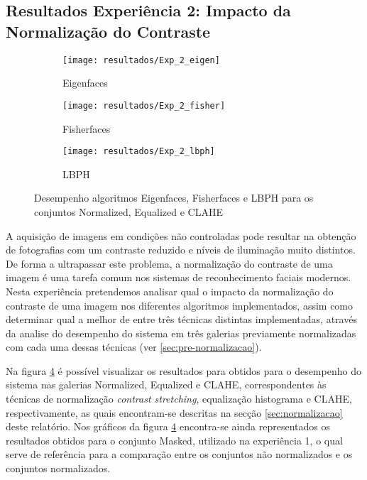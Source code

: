 \subsection{Resultados Experiência 2: Impacto da Normalização do Contraste}
\begin{figure}[p]
        \centering
        \begin{subfigure}[b]{0.58\textwidth}
                \centering
                \texttt{[image: resultados/Exp\_2\_eigen]}
                \caption{Eigenfaces}
                \label{fig:masked_normalized_equalized_clahe_eigen}
        \end{subfigure}%

        \begin{subfigure}[b]{0.58\textwidth}
                \centering
                \texttt{[image: resultados/Exp\_2\_fisher]}
                \caption{Fisherfaces}
                \label{fig:masked_normalized_equalized_clahe_fisher}
        \end{subfigure}

        \begin{subfigure}[b]{0.58\textwidth}
                \centering
                \texttt{[image: resultados/Exp\_2\_lbph]}
                \caption{LBPH}
                \label{fig:masked_normalized_equalized_clahe_lbph}
        \end{subfigure}
        \caption{Desempenho algoritmos Eigenfaces, Fisherfaces e LBPH para os conjuntos Normalized, Equalized e CLAHE}
        \label{fig:exp2}
\end{figure}

A aquisição de imagens em condições não controladas pode resultar na obtenção de fotografias com um contraste reduzido e níveis de iluminação muito distintos. De forma a ultrapassar este problema, a normalização do contraste de uma imagem é uma tarefa comum nos sistemas de reconhecimento faciais modernos. Nesta experiência pretendemos analisar qual o impacto da normalização do contraste de uma imagem nos diferentes algoritmos implementados, assim como determinar qual a melhor de entre três técnicas distintas implementadas, através da analise do desempenho do sistema em três galerias previamente normalizadas com cada uma dessas técnicas (ver \ref{sec:pre-normalizacao}).

Na figura \ref{fig:exp2} é possível visualizar os resultados para obtidos para o desempenho do sistema nas galerias Normalized, Equalized e CLAHE, correspondentes às técnicas de normalização \textit{contrast stretching}, equalização histograma e CLAHE, respectivamente, as quais encontram-se descritas na secção \ref{sec:normalizacao} deste relatório. Nos gráficos da figura \ref{fig:exp2} encontra-se ainda representados os resultados obtidos para o conjunto Masked, utilizado na experiência 1, o qual serve de referência para a comparação entre os conjuntos não normalizados e os conjuntos normalizados.

